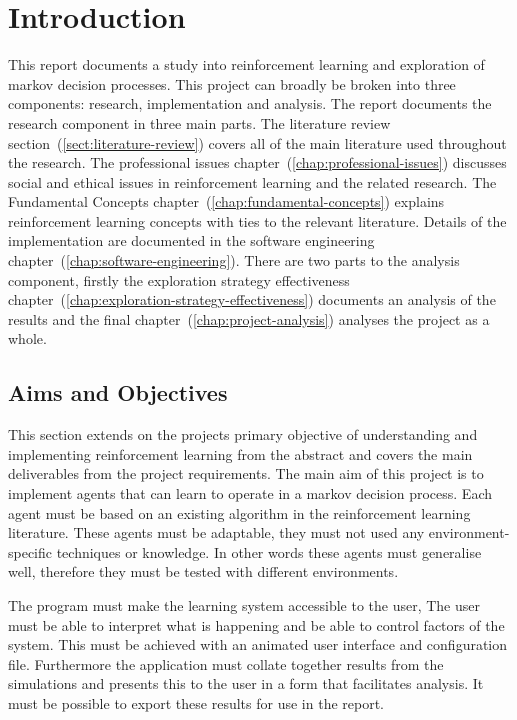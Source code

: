 \documentclass[]{final_report}
\begin{document}

\chapter{Introduction}

This report documents a study into reinforcement learning and exploration of markov decision processes. This project can broadly be broken into three components: research, implementation and analysis. The report documents the research component in three main parts. The literature review section~(\ref{sect:literature-review}) covers all of the main literature used throughout the research. The professional issues chapter~(\ref{chap:professional-issues}) discusses social and ethical issues in reinforcement learning and the related research. The Fundamental Concepts chapter~(\ref{chap:fundamental-concepts}) explains reinforcement learning concepts with ties to the relevant literature. Details of the implementation are documented in the software engineering chapter~(\ref{chap:software-engineering}). There are two parts to the analysis component, firstly the exploration strategy effectiveness chapter~(\ref{chap:exploration-strategy-effectiveness}) documents an analysis of the results and the final chapter~(\ref{chap:project-analysis}) analyses the project as a whole.

\section{Aims and Objectives}

This section extends on the projects primary objective of understanding and implementing reinforcement learning from the abstract and covers the main deliverables from the project requirements. The main aim of this project is to implement agents that can learn to operate in a markov decision process. Each agent must be based on an existing algorithm in the reinforcement learning literature. These agents must be adaptable, they must not used any environment-specific techniques or knowledge. In other words these agents must generalise well, therefore they must be tested with different environments.

The program must make the learning system accessible to the user, The user must be able to interpret what is happening and be able to control factors of the system. This must be achieved with an animated user interface and configuration file. Furthermore the application must collate together results from the simulations and presents this to the user in a form that facilitates analysis. It must be possible to export these results for use in the report. 
\end{document}
